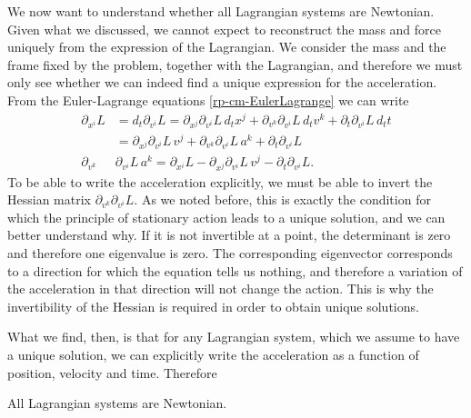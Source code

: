 We now want to understand whether all Lagrangian systems are Newtonian. Given what we discussed, we cannot expect to reconstruct the mass and force uniquely from the expression of the Lagrangian. We consider the mass and the frame fixed by the problem, together with the Lagrangian, and therefore we must only see whether we can indeed find a unique expression for the acceleration. From the Euler-Lagrange equations \ref{rp-cm-EulerLagrange} we can write
\begin{equation}
	\begin{aligned}
	\partial_{x^i}L&=d_t \partial_{v^i} L=\partial_{x^j} \partial_{v^i} L \, d_t x^j + \partial_{v^k} \partial_{v^i} L \, d_t v^k + \partial_{t} \partial_{v^i} L \, d_t t \\
	&= \partial_{x^j} \partial_{v^i} L \, v^j + \partial_{v^k} \partial_{v^i} L \, a^k + \partial_{t} \partial_{v^i} L \\
	\partial_{v^k} &\partial_{v^i} L \, a^k = \partial_{x^i}L - \partial_{x^j} \partial_{v^i} L \, v^j - \partial_{t} \partial_{v^i} L.
	\end{aligned}
\end{equation}
To be able to write the acceleration explicitly, we must be able to invert the Hessian matrix $\partial_{v^k} \partial_{v^i} L$. As we noted before, this is exactly the condition for which the principle of stationary action leads to a unique solution, and we can better understand why. If it is not invertible at a point, the determinant is zero and therefore one eigenvalue is zero. The corresponding eigenvector corresponds to a direction for which the equation tells us nothing, and therefore a variation of the acceleration in that direction will not change the action. This is why the invertibility of the Hessian is required in order to obtain unique solutions.

What we find, then, is that for any Lagrangian system, which we assume to have a unique solution, we can explicitly write the acceleration as a function of position, velocity and time. Therefore
\begin{insight}
	All Lagrangian systems are Newtonian.
\end{insight}

